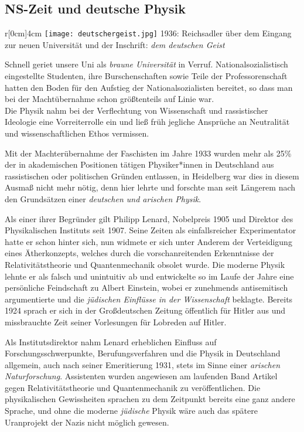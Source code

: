 \subsection*{NS-Zeit und deutsche Physik}
\begin{wrapfigure}{r}[0cm]{4cm}
\vspace{-13pt}
\texttt{[image: deutschergeist.jpg]}
\small{1936: Reichsadler über dem Eingang zur neuen Universität und der Inschrift: \textit{dem deutschen Geist}}
\vspace{-15pt}
\end{wrapfigure}

Schnell geriet unsere Uni als \textit{braune Universität} in Verruf. Nationalsozialistisch eingestellte Studenten, ihre Burschenschaften sowie Teile der Professorenschaft hatten den Boden für den Aufstieg der Nationalsozialisten bereitet, so dass man bei der Machtübernahme schon größtenteils auf Linie war.\\
Die Physik nahm bei der Verflechtung von Wissenschaft und rassistischer Ideologie eine Vorreiterrolle ein und ließ früh jegliche Ansprüche an Neutralität und wissenschaftlichen Ethos vermissen.

Mit der Machterübernahme der Faschisten im Jahre 1933 wurden mehr als 25\% der in akademischen Positionen tätigen Physiker*innen in Deutschland aus rassistischen oder politischen Gründen entlassen, in Heidelberg war dies in diesem Ausmaß nicht mehr nötig, denn hier lehrte und forschte man seit Längerem nach den Grundsätzen einer \textit{deutschen und arischen Physik}.

Als einer ihrer Begründer gilt Philipp Lenard, Nobelpreis 1905 und Direktor des Physikalischen Instituts seit 1907. 
Seine Zeiten als einfallsreicher Experimentator hatte er schon hinter sich, nun widmete er sich unter Anderem der Verteidigung eines Ätherkonzepts, welches durch die vorschanreitenden Erkenntnisse der Relativitätstheorie und Quantenmechanik obsolet wurde. Die moderne Physik lehnte er als falsch und unintuitiv ab und entwickelte so im Laufe der Jahre eine persönliche Feindschaft zu Albert Einstein, wobei er zunehmends antisemitisch argumentierte und die \textit{jüdischen Einflüsse in der Wissenschaft} beklagte. Bereits 1924 sprach er sich in der Großdeutschen Zeitung öffentlich für Hitler aus und missbrauchte Zeit seiner Vorlesungen für Lobreden auf Hitler.

Als Institutsdirektor nahm Lenard erheblichen Einfluss auf Forschungsschwerpunkte, Berufungsverfahren und die Physik in Deutschland allgemein, auch nach seiner Emeritierung 1931, stets im Sinne einer \textit{arischen Naturforschung}. Assistenten wurden angewiesen am laufenden Band Artikel gegen Relativitätstheorie und Quantenmechanik zu veröffentlichen. Die physikalischen Gewissheiten sprachen zu dem Zeitpunkt bereits eine ganz andere Sprache, und ohne die moderne \textit{jüdische} Physik wäre auch das spätere Uranprojekt der Nazis nicht möglich gewesen. 

